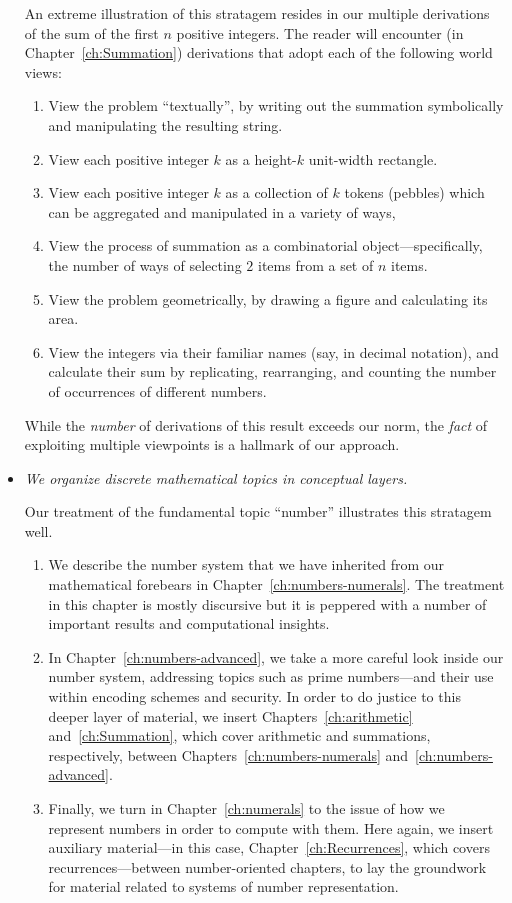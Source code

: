 \begin{itemize}
An extreme illustration of this stratagem resides in our multiple derivations of the sum of the first $n$ positive integers.  
The reader will encounter (in Chapter~\ref{ch:Summation}) derivations that adopt each of the following world views:
  \begin{enumerate}
    \item
View the problem ``textually'', by writing out the summation symbolically and manipulating the resulting string.
  \item
View each positive integer $k$ as a height-$k$ unit-width rectangle.
  \item
View each positive integer $k$ as a collection of $k$ tokens (pebbles) which can be aggregated and manipulated in a variety of ways,
  \item
View the process of summation as a combinatorial object---specifically, the number of ways of selecting $2$ items from a set of $n$ items.
  \item
View the problem geometrically, by drawing a figure and calculating its area.
  \item
View the integers via their familiar names (say, in decimal notation), and calculate their sum by replicating, rearranging, and counting the number of occurrences of different numbers.
  \end{enumerate}
While the {\em number} of derivations of this result exceeds our norm, the {\em fact} of exploiting multiple viewpoints is a hallmark of our approach.

\medskip\item
{\em We organize discrete mathematical topics in conceptual layers.}

\smallskip

Our treatment of the fundamental topic ``number'' illustrates this stratagem well.
  \begin{enumerate}
  \item
We describe the number system that we have inherited from our mathematical forebears in Chapter~\ref{ch:numbers-numerals}.  The treatment in this chapter is mostly discursive but it is peppered with a number of important results and computational insights.
 \medskip \item
In Chapter~\ref{ch:numbers-advanced}, we take a more careful look inside our number system, addressing topics such as prime numbers---and their use within encoding schemes and security.  In order to do justice to this deeper layer of material, we insert Chapters~\ref{ch:arithmetic} and~\ref{ch:Summation}, which cover arithmetic and summations, respectively, between
Chapters~\ref{ch:numbers-numerals} and~\ref{ch:numbers-advanced}.
  \medskip\item
Finally, we turn in Chapter~\ref{ch:numerals} to the issue of how we represent numbers in order to compute with them.  Here again, we insert auxiliary material---in this case, Chapter~\ref{ch:Recurrences}, which covers recurrences---between number-oriented chapters, to lay the groundwork for material related to systems of number representation.
  \end{enumerate}


\end{itemize}
